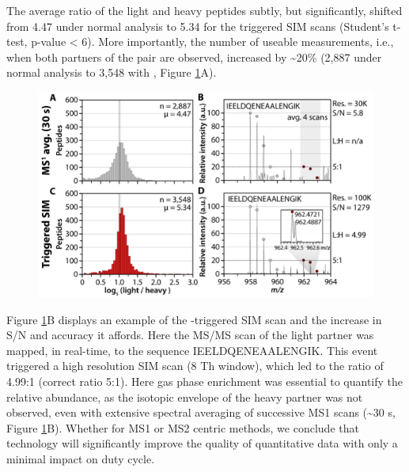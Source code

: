 The average ratio of the light and heavy peptides subtly, but significantly, shifted from 4.47 under normal analysis to 5.34 for the \inseq{} triggered SIM scans (Student's t-test, p-value < 6). More importantly, the number of useable measurements, i.e., when both partners of the pair are observed, increased by \textasciitilde20\% (2,887 under normal analysis to 3,548 with \inseq{}, Figure \ref{fig:inseqs5}A).
\begin{figure}
	\centering
	\includegraphics[width=\columnwidth]{inseq/inSeq_Fig S5.png}
	\label{fig:inseqs5}
\end{figure}
Figure \ref{fig:inseqs5}B displays an example of the \inseq{}-triggered SIM scan and the increase in S/N and accuracy it affords. Here the MS/MS scan of the light partner was mapped, in real-time, to the sequence IEELDQENEAALENGIK. This event triggered a high resolution SIM scan (8 Th window), which led to the ratio of 4.99:1 (correct ratio 5:1). Here gas phase enrichment was essential to quantify the relative abundance, as the isotopic envelope of the heavy partner was not observed, even with extensive spectral averaging of successive MS1 scans (\textasciitilde30 s, Figure \ref{fig:inseqs5}B). Whether for MS1 or MS2 centric methods, we conclude that \inseq{} technology will significantly improve the quality of quantitative data with only a minimal impact on duty cycle.

